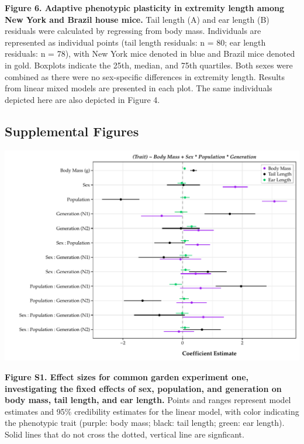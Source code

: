 \documentclass[]{article}
\begin{document}
\textbf{Figure 6. Adaptive phenotypic plasticity in extremity length
among New York and Brazil house mice.} Tail length (A) and ear length
(B) residuals were calculated by regressing from body mass. Individuals
are represented as individual points (tail length residuals: n = 80; ear
length residuals: n = 78), with New York mice denoted in blue and Brazil
mice denoted in gold. Boxplots indicate the 25th, median, and 75th
quartiles. Both sexes were combined as there were no sex-specific
differences in extremity length. Results from linear mixed models are
presented in each plot. The same individuals depicted here are also
depicted in Figure 4.

\newpage

\hypertarget{supplemental-figures}{%
\subsection{Supplemental Figures}\label{supplemental-figures}}

\includegraphics{../results/figures/GenerationsModel.pdf}

\textbf{Figure S1. Effect sizes for common garden experiment one,
investigating the fixed effects of sex, population, and generation on
body mass, tail length, and ear length.} Points and ranges represent
model estimates and 95\% credibility estimates for the linear model,
with color indicating the phenotypic trait (purple: body mass; black:
tail length; green: ear length). Solid lines that do not cross the
dotted, vertical line are signficant.

\newpage
\end{document}
